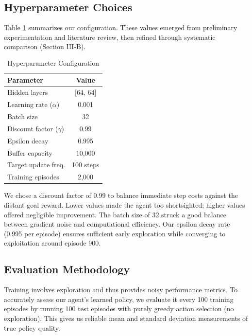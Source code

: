 \documentclass[conference]{IEEEtran}
\begin{document}
\subsection{Hyperparameter Choices}

Table \ref{tab:hyperparameters} summarizes our configuration. These values emerged from preliminary experimentation and literature review, then refined through systematic comparison (Section III-B).

\begin{table}[htbp]
\caption{Hyperparameter Configuration}
\begin{center}
\begin{tabular}{lc}
\toprule
\textbf{Parameter} & \textbf{Value} \\
\midrule
Hidden layers & [64, 64] \\
Learning rate ($\alpha$) & 0.001 \\
Batch size & 32 \\
Discount factor ($\gamma$) & 0.99 \\
Epsilon decay & 0.995 \\
Buffer capacity & 10,000 \\
Target update freq. & 100 steps \\
Training episodes & 2,000 \\
\bottomrule
\end{tabular}
\label{tab:hyperparameters}
\end{center}
\end{table}

We chose a discount factor of 0.99 to balance immediate step costs against the distant goal reward. Lower values made the agent too shortsighted; higher values offered negligible improvement. The batch size of 32 struck a good balance between gradient noise and computational efficiency. Our epsilon decay rate (0.995 per episode) ensures sufficient early exploration while converging to exploitation around episode 900.

\subsection{Evaluation Methodology}

Training involves exploration and thus provides noisy performance metrics. To accurately assess our agent's learned policy, we evaluate it every 100 training episodes by running 100 test episodes with purely greedy action selection (no exploration). This gives us reliable mean and standard deviation measurements of true policy quality.
\end{document}
